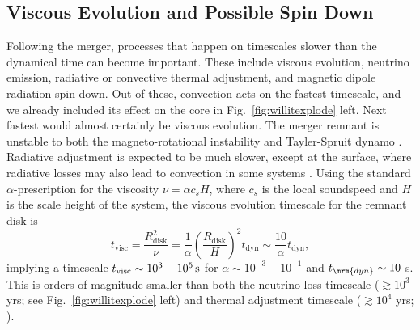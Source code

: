\subsection{Viscous Evolution and Possible Spin Down}

Following the merger, processes that happen on timescales slower than the dynamical time can become important.  These include viscous evolution, neutrino emission, radiative or convective thermal adjustment, and magnetic dipole radiation spin-down.  Out of these, convection acts on the fastest timescale, and we already included its effect on the core in Fig.~\ref{fig:willitexplode} left.  Next fastest would almost certainly be viscous evolution.  The merger remnant is unstable to both the magneto-rotational instability \citep{balbh91} and Tayler-Spruit dynamo \citep{spru02}.  Radiative adjustment is expected to be much slower, except at the surface, where radiative losses may also lead to convection in some systems \citep{shen+12,schw+12,rask+12}.  Using the standard \cite{shaks73} $\alpha$-prescription for the viscosity $\nu = \alpha c_s H$, where $c_s$ is the local soundspeed and $H$ is the scale height of the system, the viscous evolution timescale for the remnant disk is
\begin{equation}
t_\mathrm{visc} = \frac{R_\mathrm{disk}^2}{\nu} = \frac{1}{\alpha}\left(\frac{R_\mathrm{disk}}{H}\right)^2t_\mathrm{dyn} \sim \frac{10}{\alpha}t_\mathrm{dyn},
\end{equation}
implying a timescale $t_{\rm visc}\sim10^3-10^5{\rm\,s}$ for $\alpha\sim10^{-3}-10^{-1}$ and $t_\mrm{dyn} \sim 10$ s.  This is orders of magnitude smaller than both the neutrino loss timescale ($\gtrsim\!10^3$ yrs; see Fig.~\ref{fig:willitexplode} left) and thermal adjustment timescale ($\gtrsim\!10^4$ yrs; \citealt{shen+12}).


